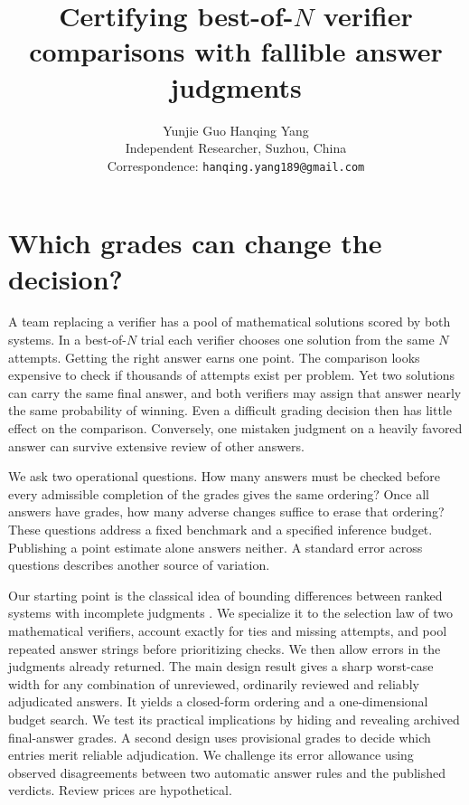 \documentclass[11pt]{article}
\title{Certifying best-of-$N$ verifier comparisons with fallible answer judgments}
\author{Yunjie Guo \qquad Hanqing Yang\\[2pt]
\small Independent Researcher, Suzhou, China\\
\small Correspondence: \texttt{hanqing.yang189@gmail.com}}
\date{}
\begin{document}
\maketitle
\begin{abstract}

\end{abstract}

\section{Which grades can change the decision?}
A team replacing a verifier has a pool of mathematical solutions scored by both systems. In a best-of-$N$ trial each verifier chooses one solution from the same $N$ attempts. Getting the right answer earns one point. The comparison looks expensive to check if thousands of attempts exist per problem. Yet two solutions can carry the same final answer, and both verifiers may assign that answer nearly the same probability of winning. Even a difficult grading decision then has little effect on the comparison. Conversely, one mistaken judgment on a heavily favored answer can survive extensive review of other answers.

We ask two operational questions. How many answers must be checked before every admissible completion of the grades gives the same ordering? Once all answers have grades, how many adverse changes suffice to erase that ordering? These questions address a fixed benchmark and a specified inference budget. Publishing a point estimate alone answers neither. A standard error across questions describes another source of variation.

Our starting point is the classical idea of bounding differences between ranked systems with incomplete judgments \cite{carterette,tan}. We specialize it to the selection law of two mathematical verifiers, account exactly for ties and missing attempts, and pool repeated answer strings before prioritizing checks. We then allow errors in the judgments already returned. The main design result gives a sharp worst-case width for any combination of unreviewed, ordinarily reviewed and reliably adjudicated answers. It yields a closed-form ordering and a one-dimensional budget search. We test its practical implications by hiding and revealing archived final-answer grades. A second design uses provisional grades to decide which entries merit reliable adjudication. We challenge its error allowance using observed disagreements between two automatic answer rules and the published verdicts. Review prices are hypothetical.
\end{document}
